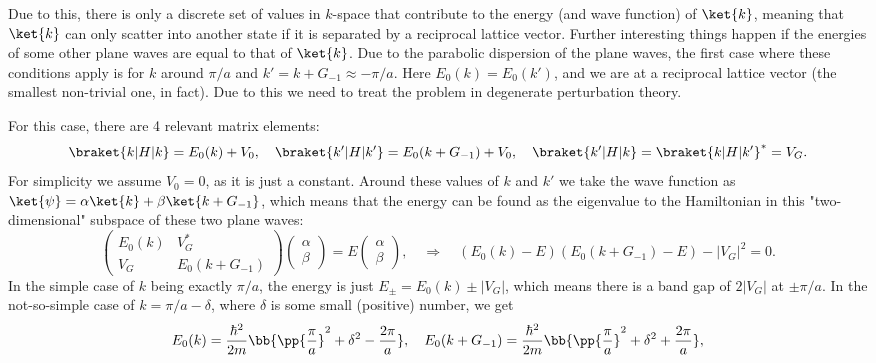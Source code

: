 \documentclass[main.tex]{subfiles}
\begin{document}
	Due to this, there is only a discrete set of values in $ k $-space that contribute to the energy (and wave function) of $ \ket{k} $, meaning that $ \ket{k} $ can only scatter into another state if it is separated by a reciprocal lattice vector. Further interesting things happen if the energies of some other plane waves are equal to that of $ \ket{k} $. Due to the parabolic dispersion of the plane waves, the first case where these conditions apply is for $ k $ around $ \pi/a $ and $ k'=k + G_{-1} \approx -\pi/a $. Here $ E_0(k) = E_0(k') $, and we are at a reciprocal lattice vector (the smallest non-trivial one, in fact). Due to this we need to treat the problem in degenerate perturbation theory.
	
	For this case, there are 4 relevant matrix elements:
	\begin{align}
		\braket{k|H|k} = E_0(k) + V_0, \quad \braket{k'|H|k'} = E_0(k+G_{-1}) + V_0, \quad \braket{k'|H|k} = \braket{k|H|k'}^* = V_G.
	\end{align}
	For simplicity we assume $ V_0 = 0 $, as it is just a constant. Around these values of $ k $ and $ k' $ we take the wave function as $ \ket{\psi} = \alpha \ket{k} + \beta \ket{k+G_{-1}} $, which means that the energy can be found as the eigenvalue to the Hamiltonian in this "two-dimensional" subspace of these two plane waves:
	\begin{equation}
		\begin{pmatrix}
			E_0(k) & V_G^* \\ V_G & E_0(k+G_{-1})
		\end{pmatrix} \begin{pmatrix}
		\alpha \\ \beta
		\end{pmatrix} = E \begin{pmatrix}
		\alpha \\ \beta
		\end{pmatrix}, \quad \Rightarrow \quad (E_0(k)-E)(E_0(k+G_{-1})-E) - |V_G|^2 = 0.
	\end{equation}
	In the simple case of $ k $ being exactly $ \pi/a $, the energy is just $ E_{\pm} = E_0(k) \pm | V_G| $, which means there is a band gap of $ 2|V_G| $ at $ \pm \pi/a $. In the not-so-simple case of $ k = \pi/a - \delta $, where $ \delta $ is some small (positive) number, we get
	\begin{equation}
		E_0(k) = \frac{\hbar^2}{2m}\bb{\pp{\frac{\pi}{a}}^2 + \delta^2 - \frac{2\pi}{a}}, \quad E_0(k+G_{-1}) = \frac{\hbar^2}{2m} \bb{\pp{\frac{\pi}{a}}^2 + \delta^2 + \frac{2\pi}{a}},
	\end{equation}
\end{document}
